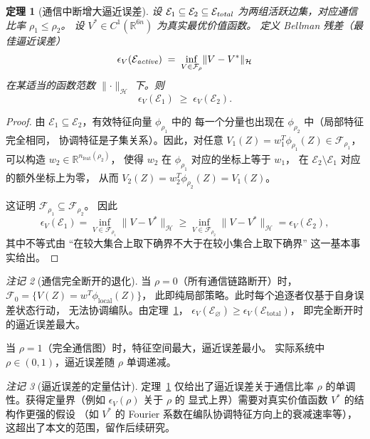 \documentclass[a4paper,11pt]{article}
\theoremstyle{plain}
\newtheorem{theorem}{定理}[section]
\theoremstyle{definition}
\theoremstyle{remark}
\newtheorem{remark}[theorem]{注记}
\newcommand{\R}{\mathbb{R}}
\newcommand{\cE}{\mathcal{E}}
\newcommand{\cF}{\mathcal{F}}
\newcommand{\norm}[1]{\lVert #1 \rVert}
\begin{document}
\begin{theorem}[通信中断增大逼近误差]\label{thm:comm_dropout}
  设 $\cE_1 \subseteq \cE_2 \subseteq \cE_{\emph{total}}$
  为两组活跃边集，对应通信比率 $\rho_1 \le \rho_2$。
  设 $V^* \in C^1(\R^{6n})$ 为真实最优价值函数。
  定义 Bellman 残差（最佳逼近误差）
  \begin{equation}\label{eq:bellman_residual}
    \epsilon_V(\cE_{\emph{active}})
    \;=\; \inf_{V \in \cF_\rho} \norm{V - V^*}_{\mathcal{H}}
  \end{equation}
  在某适当的函数范数 $\norm{\cdot}_{\mathcal{H}}$ 下。则
  \begin{equation}\label{eq:monotone_error}
    \epsilon_V(\cE_1) \;\ge\; \epsilon_V(\cE_2).
  \end{equation}
\end{theorem}

\begin{proof}
  由 $\cE_1 \subseteq \cE_2$，有效特征向量 $\phi_{\rho_1}$ 中的
  每一个分量也出现在 $\phi_{\rho_2}$ 中（局部特征完全相同，
  协调特征是子集关系）。因此，对任意
  $V_1(Z) = w_1^T \phi_{\rho_1}(Z) \in \cF_{\rho_1}$，
  可以构造 $w_2 \in \R^{n_{\text{feat}}(\rho_2)}$，
  使得 $w_2$ 在 $\phi_{\rho_1}$ 对应的坐标上等于 $w_1$，
  在 $\cE_2 \setminus \cE_1$ 对应的额外坐标上为零，
  从而 $V_2(Z) = w_2^T \phi_{\rho_2}(Z) = V_1(Z)$。

  这证明 $\cF_{\rho_1} \subseteq \cF_{\rho_2}$。
  因此
  \[
    \epsilon_V(\cE_1)
    = \inf_{V \in \cF_{\rho_1}} \norm{V - V^*}_{\mathcal{H}}
    \ge \inf_{V \in \cF_{\rho_2}} \norm{V - V^*}_{\mathcal{H}}
    = \epsilon_V(\cE_2),
  \]
  其中不等式由 ``在较大集合上取下确界不大于在较小集合上取下确界''
  这一基本事实给出。
\end{proof}

\begin{remark}[通信完全断开的退化]\label{rmk:full_dropout}
  当 $\rho = 0$（所有通信链路断开）时，
  $\cF_0 = \{V(Z) = w^T \phi_{\text{local}}(Z)\}$，
  此即纯局部策略。此时每个追逐者仅基于自身误差状态行动，
  无法协调编队。由定理~\ref{thm:comm_dropout}，
  $\epsilon_V(\cE_\varnothing) \ge \epsilon_V(\cE_{\text{total}})$，
  即完全断开时的逼近误差最大。

  当 $\rho = 1$（完全通信图）时，特征空间最大，逼近误差最小。
  实际系统中 $\rho \in (0,1)$，逼近误差随 $\rho$ 单调递减。
\end{remark}

\begin{remark}[逼近误差的定量估计]\label{rmk:quant_bound}
  定理~\ref{thm:comm_dropout} 仅给出了逼近误差关于通信比率 $\rho$
  的单调性。获得定量界（例如 $\epsilon_V(\rho)$ 关于 $\rho$ 的
  显式上界）需要对真实价值函数 $V^*$ 的结构作更强的假设
  （如 $V^*$ 的 Fourier 系数在编队协调特征方向上的衰减速率等），
  这超出了本文的范围，留作后续研究。
\end{remark}
\end{document}
